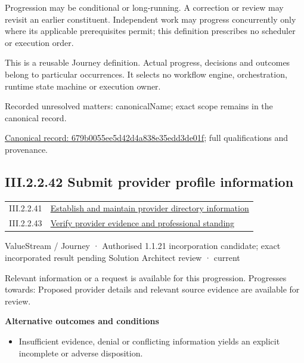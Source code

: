 Progression may be conditional or long-running. A correction or review may revisit an earlier constituent. Independent work may progress concurrently only where its applicable prerequisites permit; this definition prescribes no scheduler or execution order.



This is a reusable Journey definition. Actual progress, decisions and outcomes belong to particular occurrences. It selects no workflow engine, orchestration, runtime state machine or execution owner.


{\small Recorded unresolved matters: canonicalName; exact scope remains in the canonical record.}\par
{\footnotesize \href{../../../../continuum/strategy/value-stream/679b0055ee5d42d4a838e35edd3de01f.md}{Canonical record: 679b0055ee5d42d4a838e35edd3de01f}; full qualifications and provenance.}\par
\subsection*{III.2.2.42 Submit provider profile information}
\label{navigation:III.2.2.42}

\begin{longtable}{p{.22\linewidth}p{.73\linewidth}}
III.2.2.41 & \hyperref[element:679b0055ee5d42d4a838e35edd3de01f]{Establish and maintain provider directory information} \\
III.2.2.43 & \hyperref[element:733f2f6c9a5e49ceb0107d30bc736945]{Verify provider evidence and professional standing} \\
\end{longtable}
\label{element:872c6dd226d048298444d44b3ee00dca}
{\small ValueStream / Journey · Authorised 1.1.21 incorporation candidate; exact incorporated result pending Solution Architect review · current}\par

Relevant information or a request is available for this progression. Progresses towards: Proposed provider details and relevant source evidence are available for review.



\par\medskip\textbf{Alternative outcomes and conditions}\par


\begin{itemize}


\item Insufficient evidence, denial or conflicting information yields an explicit incomplete or adverse disposition.

\end{itemize}


